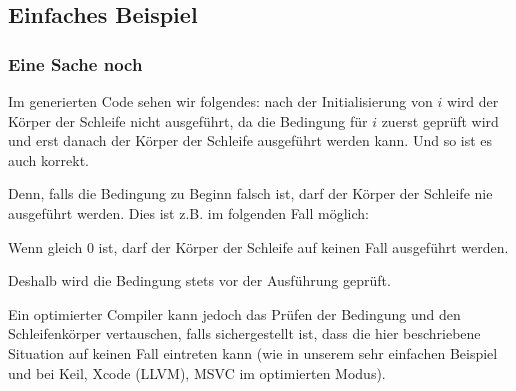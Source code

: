 \subsection{Einfaches Beispiel}





\subsubsection{Eine Sache noch}
Im generierten Code sehen wir folgendes:
nach der Initialisierung von $i$ wird der Körper der Schleife nicht ausgeführt,
da die Bedingung für $i$ zuerst geprüft wird und erst danach der Körper der
Schleife ausgeführt werden kann. Und so ist es auch korrekt.

Denn, falls die Bedingung zu Beginn falsch ist, darf der Körper der Schleife nie
ausgeführt werden. 
Dies ist z.B. im folgenden Fall möglich:




Wenn  gleich 0 ist, darf der Körper der Schleife
auf keinen Fall ausgeführt werden. 

Deshalb wird die Bedingung stets vor der Ausführung geprüft. 

Ein optimierter Compiler kann jedoch das Prüfen der Bedingung und den
Schleifenkörper vertauschen, falls sichergestellt ist, dass die hier
beschriebene Situation auf keinen Fall eintreten kann (wie in unserem sehr
einfachen Beispiel und bei Keil, Xcode (LLVM), MSVC im optimierten Modus).

